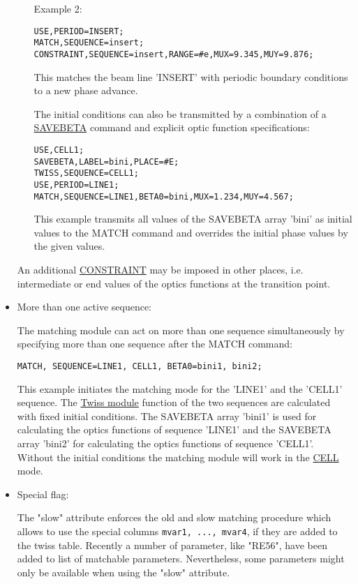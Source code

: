 \begin{itemize}
\begin{itemize}
Example 2:	
\begin{verbatim}
USE,PERIOD=INSERT;
MATCH,SEQUENCE=insert;
CONSTRAINT,SEQUENCE=insert,RANGE=#e,MUX=9.345,MUY=9.876;
\end{verbatim}
This matches the beam line 'INSERT' with periodic boundary conditions to
a new phase advance. 


 
The initial conditions can also be transmitted by a combination of a
\href{../control/general.html#savebeta}{SAVEBETA} command and explicit
optic function specifications: 
\begin{verbatim}
USE,CELL1;
SAVEBETA,LABEL=bini,PLACE=#E;
TWISS,SEQUENCE=CELL1;
USE,PERIOD=LINE1;
MATCH,SEQUENCE=LINE1,BETA0=bini,MUX=1.234,MUY=4.567;
\end{verbatim}

This example transmits all values of the SAVEBETA array 'bini' as
initial values to the MATCH command and overrides the initial phase
values by the given values.

\end{itemize}

An additional \href{match_con.html#constraint}{CONSTRAINT} may be
imposed in other places, i.e. intermediate or end values of the optics
functions at the transition point.  
 
	\item More than one active sequence:

The matching module can act on more than one sequence simultaneously by
specifying more than one sequence after the MATCH command: 
\begin{verbatim}
MATCH, SEQUENCE=LINE1, CELL1, BETA0=bini1, bini2;
\end{verbatim}
This example initiates the matching mode for the 'LINE1' and the 'CELL1'
sequence. The \href{../twiss/twiss.html}{Twiss module} function of the
two sequences are calculated with fixed initial conditions. The SAVEBETA
array 'bini1' is used for calculating the optics functions of sequence
'LINE1' and the SAVEBETA array 'bini2' for calculating the optics
functions of sequence 'CELL1'. Without the initial conditions the
matching module will work in the \href{match_main.html#cell}{CELL}
mode. 
 
	\item  Special flag:

The "slow" attribute enforces the old and slow matching procedure which
allows to use the special columns \texttt{mvar1, ..., mvar4}, if they
are added to the twiss table. Recently a number of parameter, like
"RE56", have been added to list of matchable parameters. Nevertheless,
some parameters might only be available when using the "slow" attribute. 
 
\end{itemize}
 
